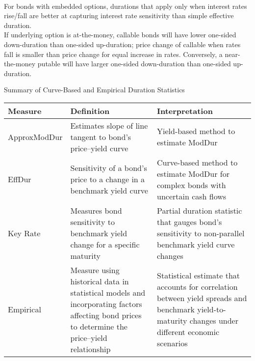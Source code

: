 \begin{remark} \\
For bonds with embedded options, durations that apply only when interest rates rise/fall are better at capturing interest rate sensitivity than simple effective duration.\\
If underlying option is at-the-money, callable bonds will have lower one-sided down-duration than one-sided up-duration; price change of callable when rates fall is smaller than price change for equal increase in rates. Conversely, a near-the-money putable will have larger one-sided down-duration than one-sided up-duration.
\end{remark}

\begin{flushleft}
Summary of Curve-Based and Empirical Duration Statistics
\begin{tabularx}{\textwidth}{p{7em}|X|X}
\hline
\rowcolor{gray!30}
Measure & Definition & Interpretation \\
\hline
ApproxModDur & Estimates slope of line tangent to bond’s price–yield curve & Yield-based method to estimate ModDur \\
\hline
EffDur & Sensitivity of a bond’s price to a change in a benchmark yield curve & Curve-based method to estimate ModDur for complex bonds with uncertain cash flows \\
\hline
Key Rate & Measures bond sensitivity to benchmark yield change for a specific maturity & Partial duration statistic that gauges bond’s sensitivity to non-parallel benchmark yield curve changes \\
\hline
Empirical & Measure using historical data in statistical models and incorporating factors affecting bond prices to determine the price–yield relationship & Statistical estimate that accounts for correlation between yield spreads and benchmark yield-to-maturity changes under different economic scenarios \\
\hline
\end{tabularx}
\end{flushleft}